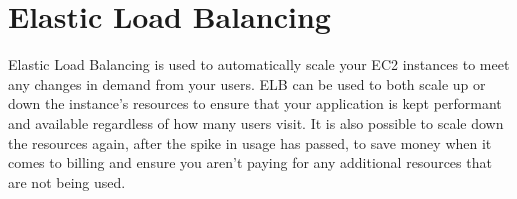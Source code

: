 \chapter{Elastic Load Balancing}\label{ch:elastic-load-balancing}
Elastic Load Balancing is used to automatically scale your EC2 instances to meet any changes in demand from your users. ELB can be used to both scale up or down the instance's resources to ensure that your application is kept performant and available regardless of how many users visit. It is also possible to scale down the resources again, after the spike in usage has passed, to save money when it comes to billing and ensure you aren't paying for any additional resources that are not being used.


